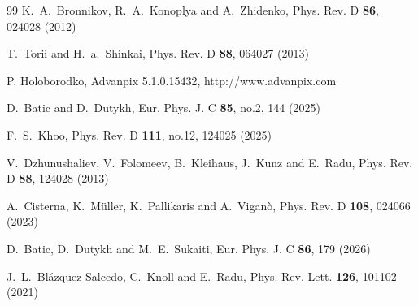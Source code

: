 \documentclass[11pt,a4paper]{article}
\begin{document}
\begin{thebibliography}{99}
K.~A.~Bronnikov, R.~A.~Konoplya and A.~Zhidenko,
Phys. Rev. D \textbf{86}, 024028 (2012)

T.~Torii and H.~a.~Shinkai,
Phys. Rev. D \textbf{88}, 064027 (2013)

P. Holoborodko, 
Advanpix 5.1.0.15432,
http://www.advanpix.com


D.~Batic and D.~Dutykh,
Eur. Phys. J. C \textbf{85}, no.2, 144 (2025)

F.~S.~Khoo,
Phys. Rev. D \textbf{111}, no.12, 124025 (2025)


V.~Dzhunushaliev, V.~Folomeev, B.~Kleihaus, J.~Kunz and E.~Radu,
Phys. Rev. D \textbf{88}, 124028 (2013)

A.~Cisterna, K.~M{\"u}ller, K.~Pallikaris and A.~Vigan{\`o},
Phys. Rev. D \textbf{108}, 024066 (2023)

D.~Batic, D.~Dutykh and M.~E.~Sukaiti,
Eur. Phys. J. C \textbf{86}, 179 (2026)




J.~L.~Bl\'azquez-Salcedo, C.~Knoll and E.~Radu,
Phys. Rev. Lett. \textbf{126}, 101102 (2021)


\end{thebibliography}
\end{document}
